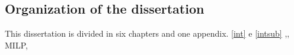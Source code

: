 \subsection{Organization of the dissertation}\label{intsub}
%
This dissertation is divided in six chapters and one appendix.
\autoref{int} e \autoref{intsub}
,, \gls{MILP}, %
% 
% 
% 
% 
% 
